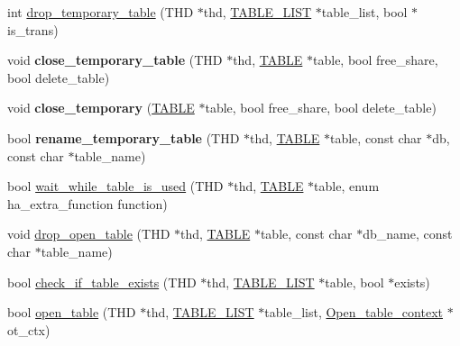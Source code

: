 \begin{DoxyCompactItemize}
\item 
int \mbox{\hyperlink{group__Data__Dictionary_gab5683a94b25579c456f2c9f55f9f9b35}{drop\+\_\+temporary\+\_\+table}} (T\+HD $\ast$thd, \mbox{\hyperlink{structTABLE__LIST}{T\+A\+B\+L\+E\+\_\+\+L\+I\+ST}} $\ast$table\+\_\+list, bool $\ast$is\+\_\+trans)
\item 
\mbox{\label{group__Data__Dictionary_ga62f62c19b7f434d061bee6a75402aca1}} 
void {\bfseries close\+\_\+temporary\+\_\+table} (T\+HD $\ast$thd, \mbox{\hyperlink{structTABLE}{T\+A\+B\+LE}} $\ast$table, bool free\+\_\+share, bool delete\+\_\+table)
\item 
\mbox{\label{group__Data__Dictionary_ga4998a4b0d6b30f4f9669a8c1169ef41d}} 
void {\bfseries close\+\_\+temporary} (\mbox{\hyperlink{structTABLE}{T\+A\+B\+LE}} $\ast$table, bool free\+\_\+share, bool delete\+\_\+table)
\item 
\mbox{\label{group__Data__Dictionary_ga1f79c4227effeafa7bad8b4582682e9a}} 
bool {\bfseries rename\+\_\+temporary\+\_\+table} (T\+HD $\ast$thd, \mbox{\hyperlink{structTABLE}{T\+A\+B\+LE}} $\ast$table, const char $\ast$db, const char $\ast$table\+\_\+name)
\item 
bool \mbox{\hyperlink{group__Data__Dictionary_gac19a8c14e089f35b82dc7a2ded67ea4b}{wait\+\_\+while\+\_\+table\+\_\+is\+\_\+used}} (T\+HD $\ast$thd, \mbox{\hyperlink{structTABLE}{T\+A\+B\+LE}} $\ast$table, enum ha\+\_\+extra\+\_\+function function)
\item 
void \mbox{\hyperlink{group__Data__Dictionary_gac9f2e6710ec001734614f4a11cde9f0f}{drop\+\_\+open\+\_\+table}} (T\+HD $\ast$thd, \mbox{\hyperlink{structTABLE}{T\+A\+B\+LE}} $\ast$table, const char $\ast$db\+\_\+name, const char $\ast$table\+\_\+name)
\item 
bool \mbox{\hyperlink{group__Data__Dictionary_ga0f7967950b623499bad7a7fc81612e16}{check\+\_\+if\+\_\+table\+\_\+exists}} (T\+HD $\ast$thd, \mbox{\hyperlink{structTABLE__LIST}{T\+A\+B\+L\+E\+\_\+\+L\+I\+ST}} $\ast$table, bool $\ast$exists)
\item 
bool \mbox{\hyperlink{group__Data__Dictionary_ga43cb5a9ba1064a36db89ad5c4d645528}{open\+\_\+table}} (T\+HD $\ast$thd, \mbox{\hyperlink{structTABLE__LIST}{T\+A\+B\+L\+E\+\_\+\+L\+I\+ST}} $\ast$table\+\_\+list, \mbox{\hyperlink{classOpen__table__context}{Open\+\_\+table\+\_\+context}} $\ast$ot\+\_\+ctx)
\item 

\end{DoxyCompactItemize}
